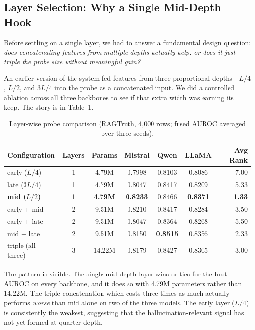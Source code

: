 \subsection{Layer Selection: Why a Single Mid-Depth Hook}
\label{sec:layer_selection}

Before settling on a single layer, we had to answer a fundamental design question: \emph{does concatenating features from multiple depths actually help, or does it just triple the probe size without meaningful gain?}

An earlier version of the system fed features from three proportional depths---$L/4$, $L/2$, and $3L/4$ into the probe as a concatenated input. We did a controlled ablation across all three backbones to see if that extra width was earning its keep. The story is in Table~\ref{tab:layer_ablation}.

\begin{table}[!htb]
\centering
\caption{Layer-wise probe comparison (RAGTruth, 4{,}000 rows; fused AUROC averaged over three seeds).}
\label{tab:layer_ablation}
\small
\begin{tabular}{@{}lcccccr@{}}
\toprule
\textbf{Configuration} & \textbf{Layers} & \textbf{Params} & \textbf{Mistral} & \textbf{Qwen} & \textbf{LLaMA} & \textbf{Avg Rank} \\
\midrule
early ($L/4$)         & 1 & 4.79M  & 0.7998          & 0.8103          & 0.8086          & 7.00 \\
late ($3L/4$)         & 1 & 4.79M  & 0.8047          & 0.8417          & 0.8209          & 5.33 \\
\textbf{mid ($L/2$)}  & \textbf{1} & \textbf{4.79M}  & \textbf{0.8233} & 0.8466          & \textbf{0.8371} & \textbf{1.33} \\
early + mid           & 2 & 9.51M  & 0.8210          & 0.8417          & 0.8284          & 3.50 \\
early + late          & 2 & 9.51M  & 0.8047          & 0.8364          & 0.8268          & 5.50 \\
mid + late            & 2 & 9.51M  & 0.8150          & \textbf{0.8515} & 0.8356          & 2.33 \\
triple (all three)    & 3 & 14.22M & 0.8179          & 0.8427          & 0.8305          & 3.00 \\
\bottomrule
\end{tabular}
\end{table}

The pattern is visible. The single mid-depth layer wins or ties for the best AUROC on every backbone, and it does so with 4.79M parameters rather than 14.22M. The triple concatenation which costs three times as much actually performs \emph{worse} than mid alone on two of the three models. The early layer ($L/4$) is consistently the weakest, suggesting that the hallucination-relevant signal has not yet formed at quarter depth.

